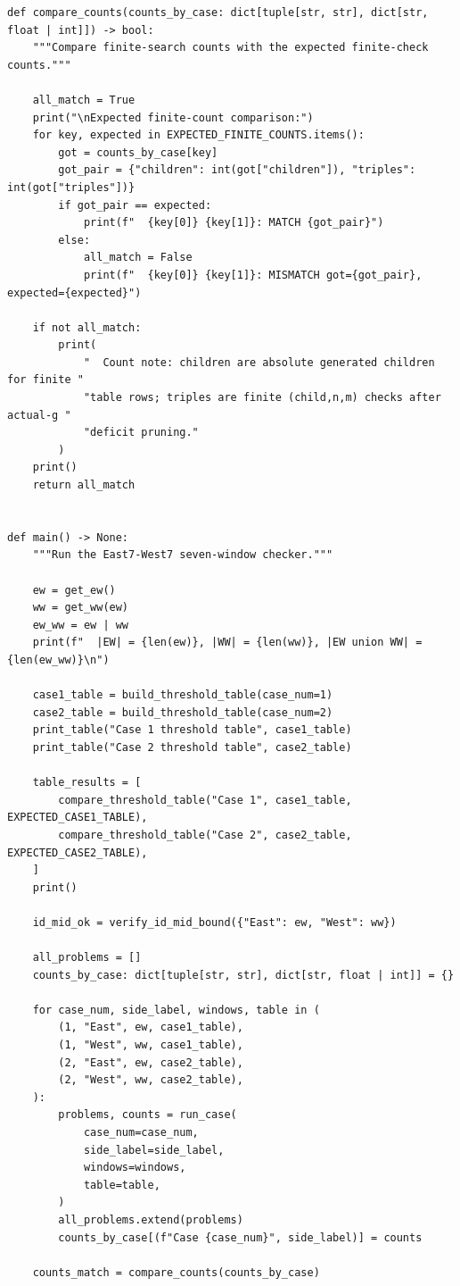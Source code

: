 \documentclass[11pt]{article}
\theoremstyle{plain}
\theoremstyle{definition}
\theoremstyle{remark}
\begin{document}
\begin{lstlisting}
def compare_counts(counts_by_case: dict[tuple[str, str], dict[str, float | int]]) -> bool:
    """Compare finite-search counts with the expected finite-check counts."""

    all_match = True
    print("\nExpected finite-count comparison:")
    for key, expected in EXPECTED_FINITE_COUNTS.items():
        got = counts_by_case[key]
        got_pair = {"children": int(got["children"]), "triples": int(got["triples"])}
        if got_pair == expected:
            print(f"  {key[0]} {key[1]}: MATCH {got_pair}")
        else:
            all_match = False
            print(f"  {key[0]} {key[1]}: MISMATCH got={got_pair}, expected={expected}")

    if not all_match:
        print(
            "  Count note: children are absolute generated children for finite "
            "table rows; triples are finite (child,n,m) checks after actual-g "
            "deficit pruning."
        )
    print()
    return all_match


def main() -> None:
    """Run the East7-West7 seven-window checker."""

    ew = get_ew()
    ww = get_ww(ew)
    ew_ww = ew | ww
    print(f"  |EW| = {len(ew)}, |WW| = {len(ww)}, |EW union WW| = {len(ew_ww)}\n")

    case1_table = build_threshold_table(case_num=1)
    case2_table = build_threshold_table(case_num=2)
    print_table("Case 1 threshold table", case1_table)
    print_table("Case 2 threshold table", case2_table)

    table_results = [
        compare_threshold_table("Case 1", case1_table, EXPECTED_CASE1_TABLE),
        compare_threshold_table("Case 2", case2_table, EXPECTED_CASE2_TABLE),
    ]
    print()

    id_mid_ok = verify_id_mid_bound({"East": ew, "West": ww})

    all_problems = []
    counts_by_case: dict[tuple[str, str], dict[str, float | int]] = {}

    for case_num, side_label, windows, table in (
        (1, "East", ew, case1_table),
        (1, "West", ww, case1_table),
        (2, "East", ew, case2_table),
        (2, "West", ww, case2_table),
    ):
        problems, counts = run_case(
            case_num=case_num,
            side_label=side_label,
            windows=windows,
            table=table,
        )
        all_problems.extend(problems)
        counts_by_case[(f"Case {case_num}", side_label)] = counts

    counts_match = compare_counts(counts_by_case)


\end{lstlisting}
\end{document}
